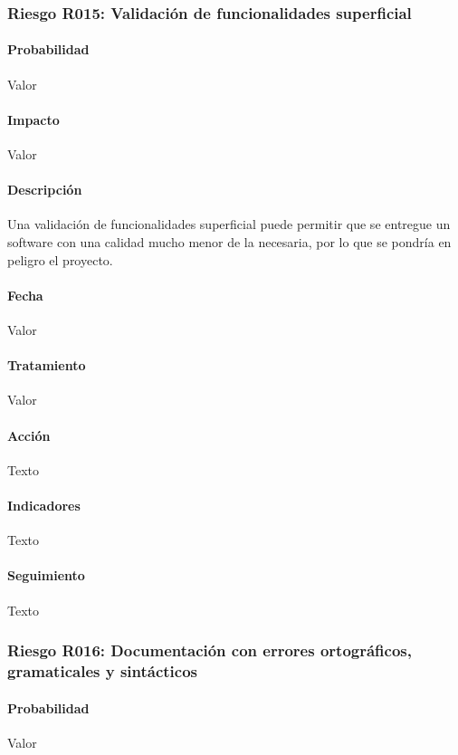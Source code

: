 \documentclass[10pt,a4paper]{article}
\begin{document}
				\subsubsection{Riesgo R015: Validación de funcionalidades superficial}
				\paragraph{Probabilidad} Valor
				\paragraph{Impacto}	Valor
				\paragraph{Descripción} Una validación de funcionalidades superficial puede permitir que se entregue un software con una calidad mucho menor de la necesaria, por lo que se pondría en peligro el proyecto. 
				\paragraph{Fecha} Valor %
				\paragraph{Tratamiento} Valor %
				\paragraph{Acción} Texto %
				\paragraph{Indicadores} Texto %
				\paragraph{Seguimiento}	Texto %
				\subsubsection{Riesgo R016: Documentación con errores ortográficos, gramaticales y sintácticos}
				\paragraph{Probabilidad} Valor
\end{document}

